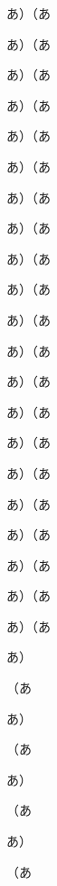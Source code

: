 

あ）\inhibitglue （あ\par             %
あ）\null\inhibitglue （あ\par        %
あ）\inhibitglue\null （あ\par        %
あ）\null\inhibitglue\null （あ\par   %
あ）\null （あ\par                    %

あ）\inhibitglue （あ\par             %
あ）\vrule\inhibitglue （あ\par       %
あ）\inhibitglue\vrule （あ\par       %
あ）\vrule\inhibitglue\vrule （あ\par %
あ）\vrule （あ\par                   %

\def\disc{\discretionary{}{}{}}
あ）\inhibitglue （あ\par             %
あ）\disc\inhibitglue （あ\par        %
あ）\inhibitglue\disc （あ\par        %
あ）\disc\inhibitglue\disc （あ\par   %
あ）\disc （あ\par                    %

\def\zskip{\hskip0pt}
あ）\inhibitglue （あ\par             %
あ）\zskip\inhibitglue （あ\par       %
あ）\inhibitglue\zskip （あ\par       %
あ）\zskip\inhibitglue\zskip （あ\par %
あ）\zskip （あ\par                   %

\def\spc{\special{}}
あ）\inhibitglue （あ\par             %
あ）\spc\inhibitglue （あ\par         %
あ）\inhibitglue\spc （あ\par         %
あ）\spc\inhibitglue\spc （あ\par     %
あ）\spc （あ\par                     %

